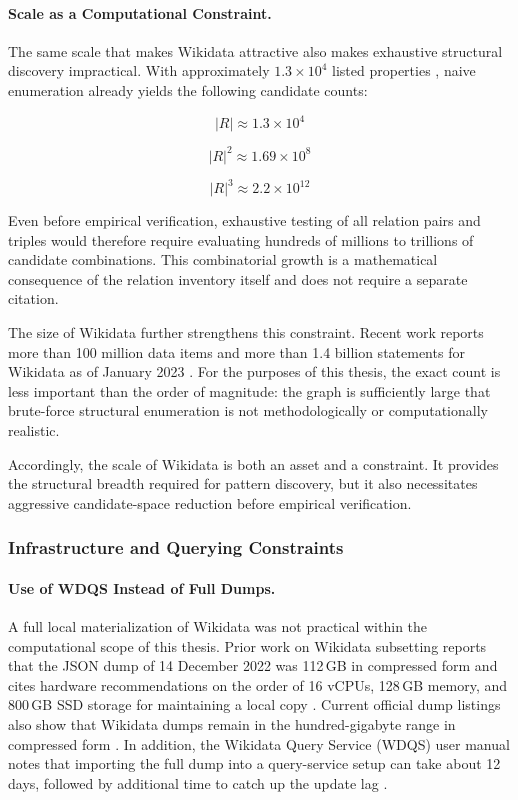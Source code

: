 \documentclass[12pt,a4paper]{article}
\begin{document}
\paragraph{Scale as a Computational Constraint.}

The same scale that makes Wikidata attractive also makes exhaustive structural discovery impractical. With approximately $1.3 \times 10^4$ listed properties \cite{wikidata_list_properties_2025}, naive enumeration already yields the following candidate counts:

\[
|R| \approx 1.3 \times 10^4
\]

\[
|R|^2 \approx 1.69 \times 10^8
\]

\[
|R|^3 \approx 2.2 \times 10^{12}
\]

Even before empirical verification, exhaustive testing of all relation pairs and triples would therefore require evaluating hundreds of millions to trillions of candidate combinations. This combinatorial growth is a mathematical consequence of the relation inventory itself and does not require a separate citation.

The size of Wikidata further strengthens this constraint. Recent work reports more than 100 million data items and more than 1.4 billion statements for Wikidata as of January 2023 \cite{hosseini2024wikidata_subsetting}. For the purposes of this thesis, the exact count is less important than the order of magnitude: the graph is sufficiently large that brute-force structural enumeration is not methodologically or computationally realistic.

Accordingly, the scale of Wikidata is both an asset and a constraint. It provides the structural breadth required for pattern discovery, but it also necessitates aggressive candidate-space reduction before empirical verification.

\subsubsection{Infrastructure and Querying Constraints}

\paragraph{Use of WDQS Instead of Full Dumps.}

A full local materialization of Wikidata was not practical within the computational scope of this thesis. Prior work on Wikidata subsetting reports that the JSON dump of 14 December 2022 was 112\,GB in compressed form and cites hardware recommendations on the order of 16 vCPUs, 128\,GB memory, and 800\,GB SSD storage for maintaining a local copy \cite{hosseini2024wikidata_subsetting}. Current official dump listings also show that Wikidata dumps remain in the hundred-gigabyte range in compressed form \cite{wikidata_dumps_2026}. In addition, the Wikidata Query Service (WDQS) user manual notes that importing the full dump into a query-service setup can take about 12 days, followed by additional time to catch up the update lag \cite{wikidata_query_service_manual}.
\end{document}
